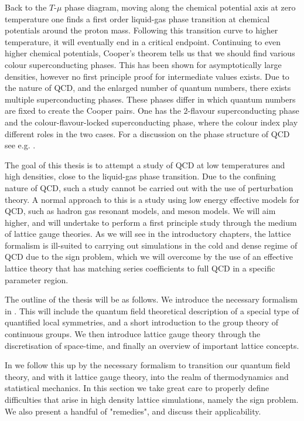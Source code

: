 Back to the $T$-$\mu$ phase diagram, moving along the chemical potential axis at
zero temperature one finds a first order liquid-gas phase transition at chemical
potentials around the proton mass.  Following this transition curve to higher
temperature, it will eventually end in a critical endpoint. Continuing to even
higher chemical potentials, Cooper's theorem tells us that we should find
various colour superconducting phases. This has been shown for asymptotically
large densities, however no first principle proof for intermediate values
exists. Due to the nature of QCD, and the enlarged number of quantum numbers,
there exists multiple superconducting phases. These phases differ in which
quantum numbers are fixed to create the Cooper pairs. One has the $2$-flavour
superconducting phase and the colour-flavour-locked superconducting phase, where
the colour index play different roles in the two cases. For a discussion on the
phase structure of QCD see e.g.  \citep{Rajagopal:2000wf,Rischke:2003mt}.

The goal of this thesis is to attempt a study of QCD at low temperatures and
high densities, close to the liquid-gas phase transition. Due to the confining
nature of QCD, such a study cannot be carried out with the use of perturbation
theory. A normal approach to this is a study using low energy effective models
for QCD, such as hadron gas resonant models, and meson models. We will aim
higher, and will undertake to perform a first principle study through the medium
of lattice gauge theories. As we will see in the introductory chapters, the
lattice formalism is ill-suited to carrying out simulations in the cold and
dense regime of QCD due to the sign problem, which we will overcome by the use
of an effective lattice theory that has matching series coefficients to full QCD
in a specific parameter region.

The outline of the thesis will be as follows. We introduce the necessary
formalism in . This will include the quantum field theoretical
description of a special type of quantified local symmetries, and a short
introduction to the group theory of continuous groups. We then introduce lattice
gauge theory through the discretisation of space-time, and finally an overview
of important lattice concepts.

In  we follow this up by the necessary formalism to transition
our quantum field theory, and with it lattice gauge theory, into the realm of
thermodynamics and statistical mechanics. In this section we take great care to
properly define difficulties that arise in high density lattice simulations,
namely the sign problem. We also present a handful of "remedies", and discuss
their applicability.

